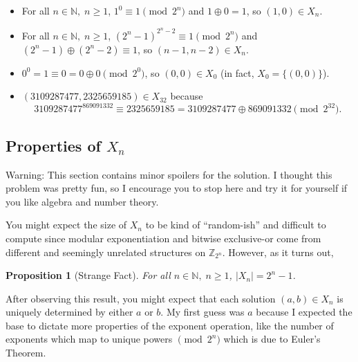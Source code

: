 \documentclass[1gpt]{article}
\theoremstyle{break}
\newtheorem{proposition}[theorem]{Proposition}
\newcommand{\xor}{\oplus}
\begin{document}
\begin{itemize}

    \item

        For all $n \in \mathbb{N},\; n \geq 1$, $1^0 \equiv 1 \pmod{2^n}$ and
        $1 \xor 0 = 1$, so $(1, 0) \in X_n$.

    \item

        For all $n \in \mathbb{N},\; n \geq 1$, $(2^n-1)^{2^n-2} \equiv 1
        \pmod{2^n}$ and $(2^n-1) \xor (2^n-2) \equiv 1$, so $(n-1, n-2) \in
        X_n$.

    \item

        $0^0 = 1 \equiv 0 = 0 \xor 0 \pmod{2^0}$, so $(0, 0) \in X_0$ (in fact,
        $X_0 = \{(0, 0)\}$).

    \item

        $(3109287477, 2325659185) \in X_{32}$ because $$3109287477^{869091332}
        \equiv 2325659185 = 3109287477 \xor 869091332 \pmod{2^{32}}.$$

\end{itemize}

\subsection{Properties of \texorpdfstring{$X_n$}{Xn}}

Warning: This section contains minor spoilers for the solution. I thought this
problem was pretty fun, so I encourage you to stop here and try it for yourself
if you like algebra and number theory.

You might expect the size of $X_n$ to be kind of ``random-ish'' and difficult
to compute since modular exponentiation and bitwise exclusive-or come from
different and seemingly unrelated structures on $\mathbb{Z}_{2^n}$. However, as
it turns out,

\begin{proposition}[Strange Fact]
    For all $n \in \mathbb{N},\; n \geq 1$, $|X_n| = 2^n - 1$.
\end{proposition}

After observing this result, you might expect that each solution $(a, b) \in
X_n$ is uniquely determined by either $a$ or $b$. My first guess was $a$
because I expected the base to dictate more properties of the exponent
operation, like the number of exponents which map to unique powers $\pmod{2^n}$
which is due to Euler's Theorem.
\end{document}
